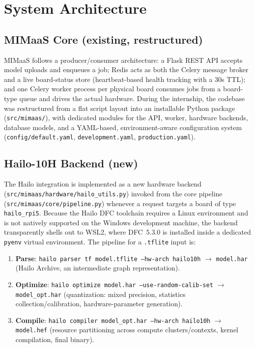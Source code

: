 \documentclass[11pt]{article}
\begin{document}
\section{System Architecture}

\subsection{MIMaaS Core (existing, restructured)}

MIMaaS follows a producer/consumer architecture: a Flask REST API accepts
model uploads and enqueues a job; Redis acts as both the Celery message
broker and a live board-status store (heartbeat-based health tracking with a
30s TTL); and one Celery worker process per physical board consumes jobs from
a board-type queue and drives the actual hardware. During the internship, the
codebase was restructured from a flat script layout into an installable
Python package (\texttt{src/mimaas/}), with dedicated modules for the API,
worker, hardware backends, database models, and a YAML-based, environment-aware
configuration system (\texttt{config/default.yaml}, \texttt{development.yaml},
\texttt{production.yaml}).

\subsection{Hailo-10H Backend (new)}

The Hailo integration is implemented as a new hardware backend
(\texttt{src/mimaas/hardware/hailo\_utils.py}) invoked from the core pipeline
(\texttt{src/mimaas/core/pipeline.py}) whenever a request targets a board of
type \texttt{hailo\_rpi5}. Because the Hailo DFC toolchain requires a Linux
environment and is not natively supported on the Windows development machine,
the backend transparently shells out to WSL2, where DFC~5.3.0 is installed
inside a dedicated \texttt{pyenv} virtual environment. The pipeline for a
\texttt{.tflite} input is:

\begin{enumerate}
  \item \textbf{Parse}: \texttt{hailo parser tf model.tflite --hw-arch hailo10h}
    $\rightarrow$ \texttt{model.har} (Hailo Archive, an intermediate graph
    representation).
  \item \textbf{Optimize}: \texttt{hailo optimize model.har --use-random-calib-set}
    $\rightarrow$ \texttt{model\_opt.har} (quantization: mixed precision,
    statistics collection/calibration, hardware-parameter generation).
  \item \textbf{Compile}: \texttt{hailo compiler model\_opt.har --hw-arch hailo10h}
    $\rightarrow$ \texttt{model.hef} (resource partitioning across compute
    clusters/contexts, kernel compilation, final binary).
\end{enumerate}
\end{document}
